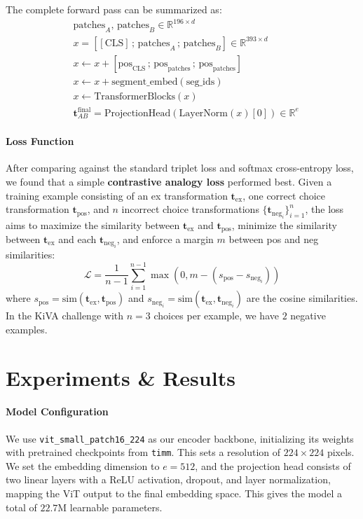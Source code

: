 \documentclass[twocolumn]{article} %
\begin{document}
The complete forward pass can be summarized as:
\begin{align*}
    &\text{patches}_A,\, \text{patches}_B \in \mathbb{R}^{196 \times d} \\
    &x = [\![\text{CLS}]\,;\, \text{patches}_A\,;\, \text{patches}_B] \in \mathbb{R}^{393 \times d} \\
    &x \leftarrow x + [\text{pos}_{\text{CLS}}\,;\, \text{pos}_{\text{patches}}\,;\, \text{pos}_{\text{patches}}] \\
    &x \leftarrow x + \text{segment\_embed}(\text{seg\_ids}) \\
    &x \leftarrow \text{TransformerBlocks}(x) \\
    &\mathbf{t}_{AB}^{\text{final}} = \text{ProjectionHead}(\text{LayerNorm}(x)[0]) \in \mathbb{R}^{e}
\end{align*}

\paragraph{Loss Function}
After comparing against the standard triplet loss and softmax cross-entropy loss, we found that a simple \textbf{contrastive analogy loss} \cite{chopra2005learning} performed best. Given a training example consisting of an ex transformation $\mathbf{t}_{\text{ex}}$, one correct choice transformation $\mathbf{t}_{\text{pos}}$, and $n$ incorrect choice transformations $\{\mathbf{t}_{\text{neg}_i}\}_{i=1}^{n}$, the loss aims to maximize the similarity between $\mathbf{t}_{\text{ex}}$ and $\mathbf{t}_{\text{pos}}$, minimize the similarity between $\mathbf{t}_{\text{ex}}$ and each $\mathbf{t}_{\text{neg}_i}$, and enforce a margin $m$ between pos and neg similarities:
\begin{equation}
\mathcal{L} = \frac{1}{n-1}\sum_{i=1}^{n-1} \max\left(0, m - \left(s_{\text{pos}} - s_{\text{neg}_i}\right)\right)
\end{equation}
where $s_{\text{pos}} = \text{sim}(\mathbf{t}_{\text{ex}}, \mathbf{t}_{\text{pos}})$ and $s_{\text{neg}_i} = \text{sim}(\mathbf{t}_{\text{ex}}, \mathbf{t}_{\text{neg}_i})$ are the cosine similarities. In the KiVA challenge with $n=3$ choices per example, we have $2$ negative examples.


\section{Experiments \& Results}


\paragraph{Model Configuration}
We use \texttt{vit\_small\_patch16\_224} as our encoder backbone, initializing its weights with pretrained checkpoints from \texttt{timm}. This sets a resolution of $224 \times 224$ pixels. We set the embedding dimension to $e=512$, and the projection head consists of two linear layers with a ReLU activation, dropout, and layer normalization, mapping the ViT output to the final embedding space. This gives the model a total of $22.7$M learnable parameters.
\end{document}
